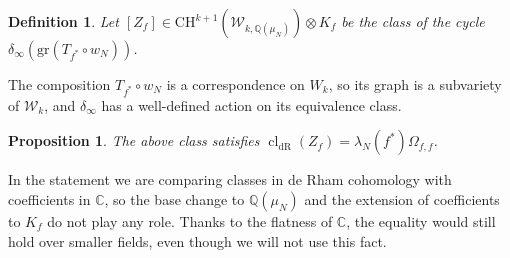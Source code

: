 \documentclass[10pt,a4paper]{amsart}
\newcommand{\KS}{\mathscr{W}}
\newcommand{\C}{\numberset{C}}
\newcommand{\CH}{\mathrm{CH}}
\newcommand{\Q}{\numberset{Q}}
\DeclareMathOperator{\cl}{cl}
\DeclareMathOperator{\dR}{dR}
\newcommand{\numberset}{\mathbb}
\newtheorem{definition}{Definition}
\newtheorem{proposition}{Proposition}
\begin{document}
\begin{definition}
    Let $[Z_f]\in\CH^{k+1}(\KS_{k,\Q(\mu_N)})\otimes K_f$ be the class of the cycle $\delta_{\infty}(\mathrm{gr}(T_{f^*}\circ w_N))$.
\end{definition}
The composition $T_{f^*}\circ w_N$ is a correspondence on $W_k$, so its graph is a subvariety of $\KS_k$, and $\delta_{\infty}$ has a well-defined action on its equivalence class.
\begin{proposition}
    \label{prop:image-cycle-dr}
 The above class satisfies $\cl_{\dR}(Z_f) = \lambda_N(f^*)\Omega_{f,f}$.
\end{proposition}
In the statement we are comparing classes in de Rham cohomology with coefficients in $\C$, so the base change to $\Q(\mu_N)$ and the extension of coefficients to $K_f$ do not play any role. Thanks to the flatness of $\C$, the equality would still hold over smaller fields, even though we will not use this fact.
\end{document}
